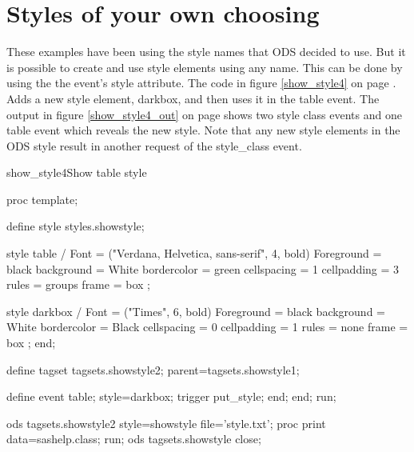 \section{Styles of your own choosing}       
These examples have been using the style names that ODS decided to use.
But it is possible to create and use style elements using any name.
This can be done by using the the event's style attribute.
The code in figure \ref{show_style4} on page \pageref{show_style4}.  
Adds a new style element, darkbox, and then uses it in the table event.
The output in figure \ref{show_style4_out} on page \pageref{show_style4_out} shows
two style class events and one table event which reveals the new style.  
Note that any new style elements in the ODS style result in another request
of the style\_class event.


\begin{fvcode}{show_style4}{Show table style}

proc template;

    define style styles.showstyle;

        style table /
          Font = ("Verdana, Helvetica, sans-serif", 4, bold)
          Foreground = black
          background = White
          bordercolor = green
          cellspacing = 1
          cellpadding = 3
          rules = groups
          frame = box
        ;

        style darkbox /
          Font = ("Times", 6, bold)
          Foreground = black
          background = White
          bordercolor = Black
          cellspacing = 0
          cellpadding = 1
          rules = none
          frame = box
        ;
    end;

    define tagset tagsets.showstyle2;
        parent=tagsets.showstyle1;

        define event table;
           style=darkbox;
           trigger put_style;
        end;
    end;
run;

ods tagsets.showstyle2 style=showstyle file='style.txt';
proc print data=sashelp.class; run;
ods tagsets.showstyle close;
\end{fvcode}
       
